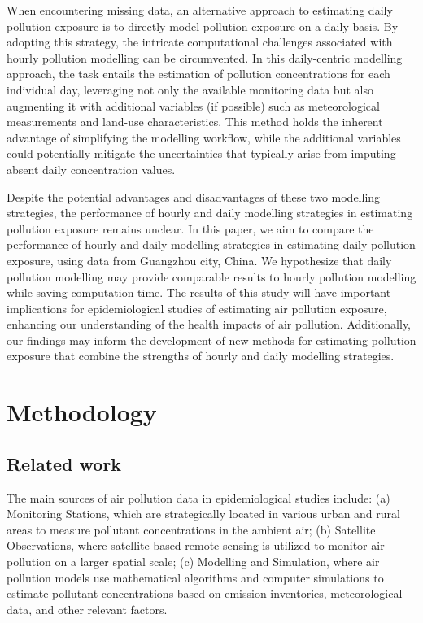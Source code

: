 \documentclass[
  12,
]{article}
\begin{document}
When encountering missing data, an alternative approach to estimating
daily pollution exposure is to directly model pollution exposure on a
daily basis. By adopting this strategy, the intricate computational
challenges associated with hourly pollution modelling can be
circumvented. In this daily-centric modelling approach, the task entails
the estimation of pollution concentrations for each individual day,
leveraging not only the available monitoring data but also augmenting it
with additional variables (if possible) such as meteorological
measurements and land-use characteristics. This method holds the
inherent advantage of simplifying the modelling workflow, while the
additional variables could potentially mitigate the uncertainties that
typically arise from imputing absent daily concentration values.

Despite the potential advantages and disadvantages of these two
modelling strategies, the performance of hourly and daily modelling
strategies in estimating pollution exposure remains unclear. In this
paper, we aim to compare the performance of hourly and daily modelling
strategies in estimating daily pollution exposure, using data from
Guangzhou city, China. We hypothesize that daily pollution modelling may
provide comparable results to hourly pollution modelling while saving
computation time. The results of this study will have important
implications for epidemiological studies of estimating air pollution
exposure, enhancing our understanding of the health impacts of air
pollution. Additionally, our findings may inform the development of new
methods for estimating pollution exposure that combine the strengths of
hourly and daily modelling strategies.

\hypertarget{methodology}{%
\section{Methodology}\label{methodology}}

\hypertarget{related-work}{%
\subsection{Related work}\label{related-work}}

The main sources of air pollution data in epidemiological studies
include: (a) Monitoring Stations, which are strategically located in
various urban and rural areas to measure pollutant concentrations in the
ambient air; (b) Satellite Observations, where satellite-based remote
sensing is utilized to monitor air pollution on a larger spatial scale;
(c) Modelling and Simulation, where air pollution models use
mathematical algorithms and computer simulations to estimate pollutant
concentrations based on emission inventories, meteorological data, and
other relevant factors.
\end{document}
